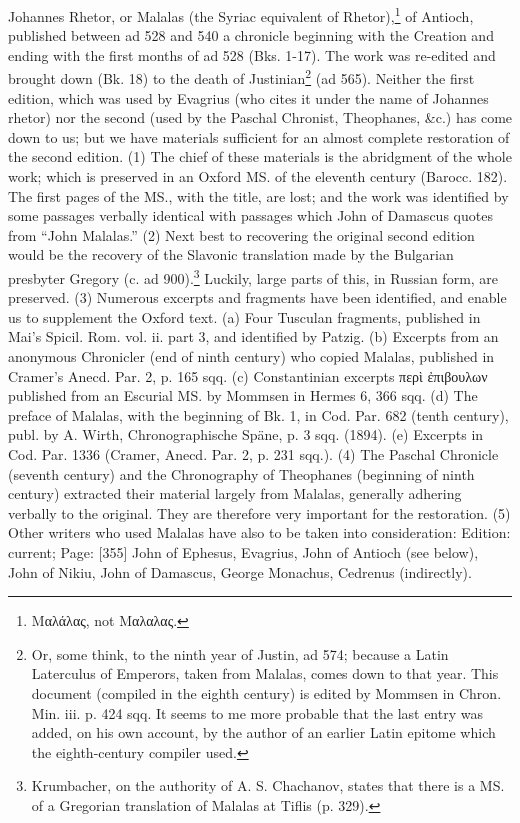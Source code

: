 Johannes Rhetor, or Malalas (the Syriac equivalent of Rhetor),\footnote{\textgreek{Μαλάλας}, not \textgreek{Μαλαλας}.} of Antioch, published between ad 528 and 540 a chronicle beginning with the Creation and ending with the first months of ad 528 (Bks. 1-17). The work was re-edited and brought down (Bk. 18) to the death of Justinian\footnote{Or, some think, to the ninth year of Justin, ad 574; because a Latin Laterculus of Emperors, taken from Malalas, comes down to that year. This document (compiled in the eighth century) is edited by Mommsen in Chron. Min. iii. p. 424 sqq. It seems to me more probable that the last entry was added, on his own account, by the author of an earlier Latin epitome which the eighth-century compiler used.} (ad 565). Neither the first edition, which was used by Evagrius (who cites it under the name of Johannes rhetor) nor the second (used by the Paschal Chronist, Theophanes, \&c.) has come down to us; but we have materials sufficient for an almost complete restoration of the second edition. (1) The chief of these materials is the abridgment of the whole work; which is preserved in an Oxford MS. of the eleventh century (Barocc. 182). The first pages of the MS., with the title, are lost; and the work was identified by some passages verbally identical with passages which John of Damascus quotes from \texthebrew{“}John Malalas.\texthebrew{}” (2) Next best to recovering the original second edition would be the recovery of the Slavonic translation made by the Bulgarian presbyter Gregory (c. ad 900).\footnote{Krumbacher, on the authority of A. S. Chachanov, states that there is a MS. of a Gregorian translation of Malalas at Tiflis (p. 329).} Luckily, large parts of this, in Russian form, are preserved. (3) Numerous excerpts and fragments have been identified, and enable us to supplement the Oxford text. (a) Four Tusculan fragments, published in Mai\texthebrew{}’s Spicil. Rom. vol. ii. part 3, and identified by Patzig. (b) Excerpts from an anonymous Chronicler (end of ninth century) who copied Malalas, published in Cramer\texthebrew{}’s Anecd. Par. 2, p. 165 sqq. (c) Constantinian excerpts \textgreek{περ\texthebrew{ὶ ἐ}πιβουλων} published from an Escurial MS. by Mommsen in Hermes 6, 366 sqq. (d) The preface of Malalas, with the beginning of Bk. 1, in Cod. Par. 682 (tenth century), publ. by A. Wirth, Chronographische Späne, p. 3 sqq. (1894). (e) Excerpts in Cod. Par. 1336 (Cramer, Anecd. Par. 2, p. 231 sqq.). (4) The Paschal Chronicle (seventh century) and the Chronography of Theophanes (beginning of ninth century) extracted their material largely from Malalas, generally adhering verbally to the original. They are therefore very important for the restoration. (5) Other writers who used Malalas have also to be taken into consideration: Edition: current; Page: [355] John of Ephesus, Evagrius, John of Antioch (see below), John of Nikiu, John of Damascus, George Monachus, Cedrenus (indirectly).


